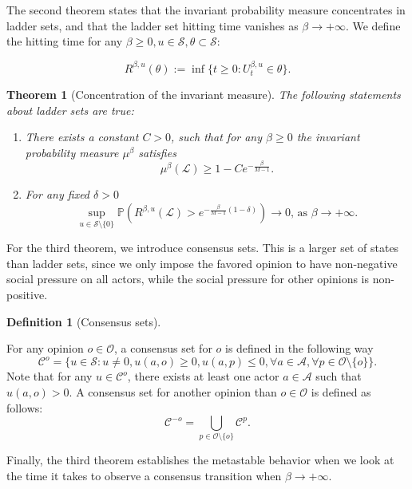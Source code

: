 \documentclass[11pt]{article}
\newtheorem{theorem}{Theorem}
\theoremstyle{definition}
\newtheorem{definition}{Definition}
\newcommand{\A}{\mathcal{A}}
\begin{document}
The second theorem states that the invariant probability measure concentrates in ladder sets, and that the ladder set hitting time vanishes as $\beta\rightarrow+\infty$. We define the hitting time for any $\beta\geq0, u\in\mathcal{S}, \theta \subset\mathcal{S}$:

$$
    R^{\beta,u}(\theta):=\inf\{t\geq0:U^{\beta,u}_t\in\theta\}.
$$

\begin{theorem}[Concentration of the invariant measure]\label{Theorem 2} The following statements about ladder sets are true:
        \begin{enumerate}
            \item There exists a constant $C>0$, such that for any $\beta\geq 0$ the invariant probability measure $\mu^{\beta}$ satisfies
            \[\mu^{\beta}(\mathcal{L})\geq 1-Ce^{-\frac{\beta}{M-1}}. \]
            \item For any fixed $\delta>0$
            \[\sup_{u\in\mathcal{S}\setminus\{0\}}\mathbb{P}\left(R^{\beta, u}(\mathcal{L})>e^{-\frac{\beta}{M-1}(1-\delta)} \right)\rightarrow 0\text{, as }\beta\rightarrow +\infty. \]
    \end{enumerate}
\end{theorem}

For the third theorem, we introduce consensus sets. This is a larger set of states than ladder sets, since we only impose the favored opinion to have non-negative social pressure on all actors, while the social pressure for other opinions is non-positive.

\begin{definition}[Consensus sets]\label{newCminus}

For any opinion $o\in\mathcal{O}$, a consensus set for $o$ is defined in the following way
\begin{equation}\label{C}
    \mathcal{C}^o = \{u \in \mathcal{S}:u\neq 0, u(a,o)\geq 0 ,u(a,p)\leq 0, \forall a\in\mathcal{A}, \forall p\in\mathcal{O}\setminus\{o\}\}.
\end{equation}
Note that for any $u\in \mathcal{C}^o$, there exists at least one actor $a\in \A$ such that $u(a,o)>0$.
    A consensus set for another opinion than $o\in\mathcal{O}$ is defined as follows:
    \[
    \mathcal{C}^{-o}=\bigcup_{p\in\mathcal{O}\setminus\{o\}}\mathcal{C}^p .
    \]
\end{definition}

Finally, the third theorem establishes the metastable behavior when we look at the time it takes to observe a consensus transition when $\beta\rightarrow+\infty$.
\end{document}
